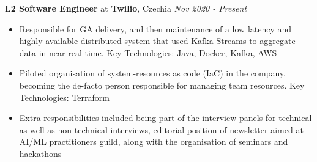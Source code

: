 
{\textbf{L2 Software Engineer} at \textbf{Twilio}, Czechia} 
    \hfill {\em Nov 2020 - Present}
    \begin{itemize}
        \item Responsible for GA delivery, and then maintenance of a low latency and highly available distributed system that used Kafka Streams to aggregate data in near real time. Key Technologies: Java, Docker, Kafka, AWS
        \item Piloted organisation of system-resources as code (IaC) in the company, becoming the de-facto person responsible for managing team resources. Key Technologies: Terraform
        \item Extra responsibilities included being part of the interview panels for technical as well as non-technical interviews, editorial position of newsletter aimed at AI/ML practitioners guild, along with the organisation of seminars and hackathons
    \end{itemize}